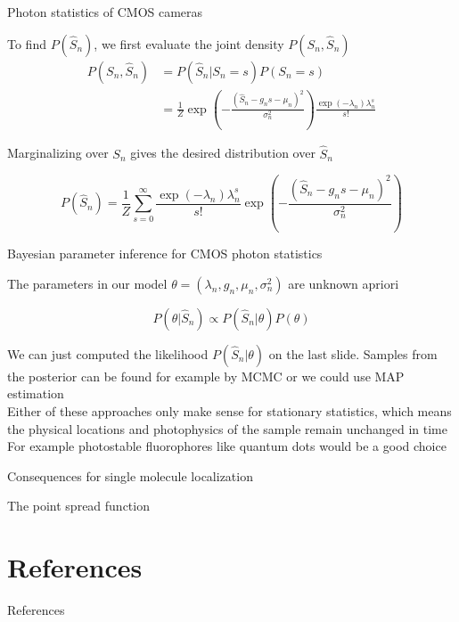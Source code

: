 \documentclass[aspectratio=1610]{beamer}					%
\begin{document}
\begin{frame}{Photon statistics of CMOS cameras}

To find $P(\hat{S}_{n})$, we first evaluate the joint density $P(S_{n},\hat{S}_{n})$
\vspace{0.1in}
\begin{align*}
P(S_{n},\hat{S}_{n}) &= P(\hat{S}_{n}|S_{n}=s)P(S_{n}=s)\\
&= \frac{1}{Z}\exp\left(-\frac{(\hat{S}_{n}-g_{n}s-\mu_{n})^{2}}{\sigma_{n}^{2}}\right)\frac{\exp\left({-\lambda_{n}}\right)\lambda_{n}^{s}}{s!}
\end{align*}
\vspace{0.1in}

Marginalizing over $S_{n}$ gives the desired distribution over $\hat{S}_{n}$

\begin{equation*}
P(\hat{S}_{n}) = \frac{1}{Z}\sum_{s=0}^{\infty}\frac{\exp\left({-\lambda_{n}}\right)\lambda_{n}^{s}}{s!}\exp\left(-\frac{(\hat{S}_{n}-g_{n}s-\mu_{n})^{2}}{\sigma_{n}^{2}}\right)
\end{equation*}

\end{frame}

\begin{frame}{Bayesian parameter inference for CMOS photon statistics}

The parameters in our model $\theta = (\lambda_{n},g_{n},\mu_{n},\sigma^{2}_{n})$ are unknown apriori


\begin{equation*}
P(\theta|\hat{S}_{n}) \propto P(\hat{S}_{n}|\theta)P(\theta)
\end{equation*}

\vspace{0.2in}
We can just computed the likelihood $P(\hat{S}_{n}|\theta)$ on the last slide. Samples from the posterior can be found for example by MCMC or we could use MAP estimation\\
\vspace{0.2in}
Either of these approaches only make sense for stationary statistics, which means the physical locations and photophysics of the sample remain unchanged in time\\
\vspace{0.2in}
For example photostable fluorophores like quantum dots would be a good choice

\end{frame}

\begin{frame}{Consequences for single molecule localization}

The point spread function

\end{frame}

\section{References}

\begin{frame}[allowframebreaks]{References}
	\tiny
	
\end{frame}
\end{document}
